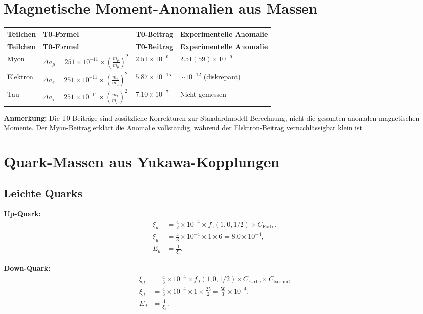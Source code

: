 \documentclass[12pt,a4paper]{article}
\begin{document}
	\section{Magnetische Moment-Anomalien aus Massen}
	\begin{longtable}{|p{3cm}|p{5cm}|p{4cm}|p{3cm}|}
		\hline
		\textbf{Teilchen} & \textbf{T0-Formel} & \textbf{T0-Beitrag} & \textbf{Experimentelle Anomalie} \\
		\hline
		\endfirsthead
		\hline
		\textbf{Teilchen} & \textbf{T0-Formel} & \textbf{T0-Beitrag} & \textbf{Experimentelle Anomalie} \\
		\hline
		\endhead
		Myon & $\Delta a_{\mu} = 251 \times 10^{-11} \times \left(\frac{m_{\mu}}{m_{\mu}}\right)^{2}$ & $2.51 \times 10^{-9}$ & $2.51(59) \times 10^{-9}$ \\
		\hline
		Elektron & $\Delta a_{e} = 251 \times 10^{-11} \times \left(\frac{m_{e}}{m_{\mu}}\right)^{2}$ & $5.87 \times 10^{-15}$ & $\sim 10^{-12}$ (diskrepant) \\
		\hline
		Tau & $\Delta a_{\tau} = 251 \times 10^{-11} \times \left(\frac{m_{\tau}}{m_{\mu}}\right)^{2}$ & $7.10 \times 10^{-7}$ & Nicht gemessen \\
		\hline
	\end{longtable}
	
	\textbf{Anmerkung:} Die T0-Beiträge sind zusätzliche Korrekturen zur Standardmodell-Berechnung, nicht die gesamten anomalen magnetischen Momente. Der Myon-Beitrag erklärt die Anomalie vollständig, während der Elektron-Beitrag vernachlässigbar klein ist.
	

	
	\section{Quark-Massen aus Yukawa-Kopplungen}
	\subsection{Leichte Quarks}
	
	\textbf{Up-Quark:}
	\begin{align}
		\xi_u &= \frac{4}{3} \times 10^{-4} \times f_u(1,0,1/2) \times C_{\text{Farbe}}, \\
		\xi_u &= \frac{4}{3} \times 10^{-4} \times 1 \times 6 = 8.0 \times 10^{-4}, \\
		E_u &= \frac{1}{\xi_u}.
	\end{align}
	
	\textbf{Down-Quark:}
	\begin{align}
		\xi_d &= \frac{4}{3} \times 10^{-4} \times f_d(1,0,1/2) \times C_{\text{Farbe}} \times C_{\text{Isospin}}, \\
		\xi_d &= \frac{4}{3} \times 10^{-4} \times 1 \times \frac{25}{2} = \frac{50}{3} \times 10^{-4}, \\
		E_d &= \frac{1}{\xi_d}.
	\end{align}
	
\end{document}
